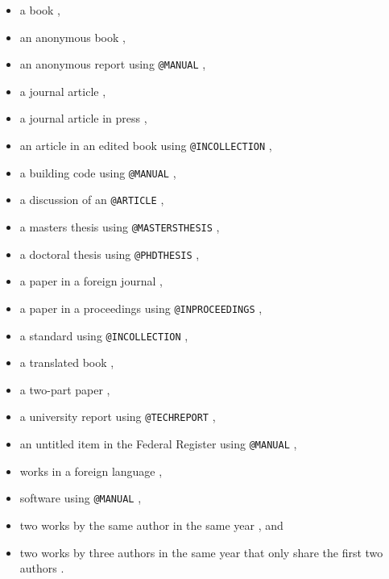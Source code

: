 \documentclass[Journal,letterpaper]{ascelike-new}
\begin{document}
\begin{itemize}
      \item a book \cite{Goossens:1994a},
      \item an anonymous book \cite{Moody:1988a},
      \item an anonymous report using \texttt{@MANUAL} \cite{FHWA:1991a},
      \item a journal article \cite{Stahl:2004a,Pennoni:1992a},
      \item a journal article in press \cite{Dasgupta:2008a},
      \item an article in an edited book using \texttt{@INCOLLECTION} \cite{Zadeh:1981a},
      \item a building code using \texttt{@MANUAL} \cite{ICBO:1988a},
      \item a discussion of an \texttt{@ARTICLE} \cite{Vesilind:1992a},
      \item a masters thesis using \texttt{@MASTERSTHESIS} \cite{Sotiropulos:1991a},
      \item a doctoral thesis using \texttt{@PHDTHESIS} \cite{Chang:1987a},
      \item a paper in a foreign journal \cite{Ireland:1954a},
      \item a paper in a proceedings using \texttt{@INPROCEEDINGS}
            \cite{Eshenaur:1991a,Garrett:2003a},
      \item a standard using \texttt{@INCOLLECTION} \cite{ASTM:1991a},
      \item a translated book \cite{Melan:1913a},
      \item a two-part paper \cite{Frater:1992a,Frater:1992b},
      \item a university report using \texttt{@TECHREPORT} \cite{Duan:1990a},
      \item an untitled item in the Federal Register using
            \texttt{@MANUAL} \cite{FR:1968a},
      \item works in a foreign language \cite{Duvant:1972a,Reiffenstuhl:1982a},
      \item software using \texttt{@MANUAL} \cite{Lotus:1985a},
      \item two works by the same author in the same year
            \cite{Gaspar:2001b,Gaspar:2001a}, and
      \item two works by three authors in the same year that only share
            the first two authors \cite{Huang2009a,Huang2009b}.
\end{itemize}
\end{document}
